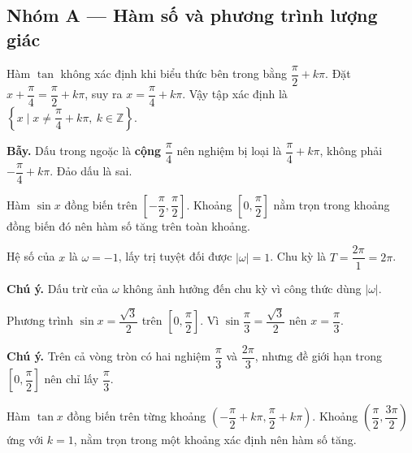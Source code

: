 \documentclass[11pt, a4paper]{article}
\begin{document}

\subsection*{Nhóm A — Hàm số và phương trình lượng giác}

\begin{dapan}[1 — Đáp án A]
Hàm $\tan$ không xác định khi biểu thức bên trong bằng $\dfrac{\pi}{2} + k\pi$. Đặt $x + \dfrac{\pi}{4} = \dfrac{\pi}{2} + k\pi$, suy ra $x = \dfrac{\pi}{4} + k\pi$. Vậy tập xác định là $\left\{x \mid x \neq \dfrac{\pi}{4} + k\pi,\ k \in \mathbb{Z}\right\}$.

\textbf{Bẫy.} Dấu trong ngoặc là \textbf{cộng} $\dfrac{\pi}{4}$ nên nghiệm bị loại là $\dfrac{\pi}{4} + k\pi$, không phải $-\dfrac{\pi}{4} + k\pi$. Đảo dấu là sai.
\end{dapan}

\begin{dapan}[2 — Đáp án A]
Hàm $\sin x$ đồng biến trên $\left[-\dfrac{\pi}{2}, \dfrac{\pi}{2}\right]$. Khoảng $\left[0, \dfrac{\pi}{2}\right]$ nằm trọn trong khoảng đồng biến đó nên hàm số tăng trên toàn khoảng.
\end{dapan}

\begin{dapan}[3 — Đáp án A]
Hệ số của $x$ là $\omega = -1$, lấy trị tuyệt đối được $|\omega| = 1$. Chu kỳ là $T = \dfrac{2\pi}{1} = 2\pi$.

\textbf{Chú ý.} Dấu trừ của $\omega$ không ảnh hưởng đến chu kỳ vì công thức dùng $|\omega|$.
\end{dapan}

\begin{dapan}[4 — Đáp án B]
Phương trình $\sin x = \dfrac{\sqrt{3}}{2}$ trên $\left[0, \dfrac{\pi}{2}\right]$. Vì $\sin\dfrac{\pi}{3} = \dfrac{\sqrt{3}}{2}$ nên $x = \dfrac{\pi}{3}$.

\textbf{Chú ý.} Trên cả vòng tròn có hai nghiệm $\dfrac{\pi}{3}$ và $\dfrac{2\pi}{3}$, nhưng đề giới hạn trong $\left[0, \dfrac{\pi}{2}\right]$ nên chỉ lấy $\dfrac{\pi}{3}$.
\end{dapan}

\begin{dapan}[5 — Đáp án A]
Hàm $\tan x$ đồng biến trên từng khoảng $\left(-\dfrac{\pi}{2} + k\pi, \dfrac{\pi}{2} + k\pi\right)$. Khoảng $\left(\dfrac{\pi}{2}, \dfrac{3\pi}{2}\right)$ ứng với $k = 1$, nằm trọn trong một khoảng xác định nên hàm số tăng.
\end{dapan}
\end{document}
